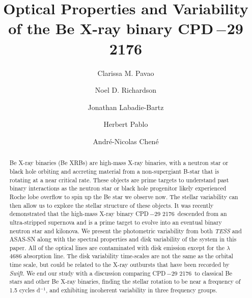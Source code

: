 \documentclass[]{aastex631}
\newcommand{\target}{CPD\,$-$29 2176}
\begin{document}
\title{Optical Properties and Variability of the Be X-ray binary \target}




\author[0000-0002-3244-682X]{Clarissa M. Pavao}

\author[0000-0002-2806-9339]{Noel D. Richardson}

\author[0000-0002-2919-6786]{Jonathan Labadie-Bartz}

\author[0000-0002-1355-5860]{Herbert Pablo}

\author[0000-0002-1115-6559]{Andr\'e-Nicolas Chen\'e}







\begin{abstract}

Be X-ray binaries (Be XRBs) are high-mass X-ray binaries, with a neutron star or black hole orbiting and accreting material from a non-supergiant B-star that is rotating at a near critical rate. These objects are prime targets to understand past binary interactions as the neutron star or black hole progenitor likely experienced Roche lobe overflow to spin up the Be star we observe now. The stellar variability can then allow us to explore the stellar structure of these objects. 
It was recently demonstrated that the high-mass X-ray binary \target\ descended from an ultra-stripped supernova and is a prime target to evolve into an eventual binary neutron star and kilonova. We present the photometric variability from both \textit{TESS} and ASAS-SN along with the spectral properties and disk variability of the system in this paper. All of the optical lines are contaminated with disk emission except for the  $\lambda$4686 absorption line. The disk variability time-scales are not the same as the orbital time scale, but could be related to the X-ray outbursts that have been recorded by \textit{Swift}. We end our study with a discussion comparing \target\ to classical Be stars and other Be X-ray binaries, finding the stellar rotation to be near a frequency of 1.5 cycles d$^{-1}$, and exhibiting incoherent variability in three frequency groups. 



\end{abstract}
\end{document}
